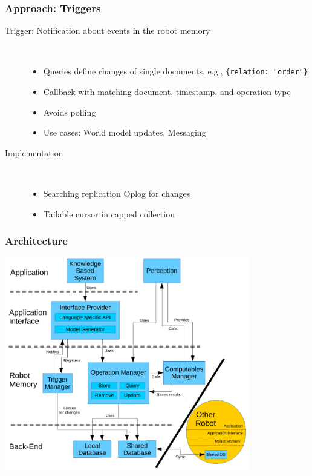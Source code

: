 \begin{frame}
  \frametitle{Approach: Triggers}
  \begin{description}
  \item[Trigger: Notification about events in the robot memory]%
                \hfill \\
    \begin{itemize}
    \item Queries define changes of single documents, e.g., \texttt{\{relation: "order"\}}
    \item Callback with matching document, timestamp, and operation type
    \item Avoids polling
    \item Use cases: World model updates, Messaging %
    \end{itemize}
  \item[Implementation]%
                \hfill \\
    \begin{itemize}
    \item Searching replication Oplog for changes
    \item Tailable cursor in capped collection %
    \end{itemize}
  \end{description}
\end{frame}

\begin{frame}
  \frametitle{Architecture}
  \center
  \includegraphics[width=0.8\textwidth]{../thesis/architecture.pdf}
\end{frame}


